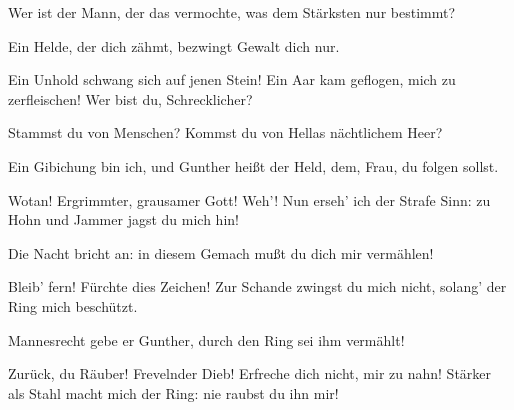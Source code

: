 \begin{drama}
\Brunnhildespeaks



Wer ist der Mann,
der das vermochte,
was dem Stärksten nur bestimmt?
 

\Siegfriedspeaks



Ein Helde, der dich zähmt,
bezwingt Gewalt dich nur.
 

\Brunnhildespeaks



Ein Unhold schwang sich auf jenen Stein!
Ein Aar kam geflogen,
mich zu zerfleischen!
Wer bist du, Schrecklicher?
 



Stammst du von Menschen?
Kommst du von Hellas nächtlichem Heer?
 

\Siegfriedspeaks



Ein Gibichung bin ich,
und Gunther heißt der Held,
dem, Frau, du folgen sollst.
 

\Brunnhildespeaks



Wotan! Ergrimmter, grausamer Gott!
Weh'! Nun erseh' ich der Strafe Sinn:
zu Hohn und Jammer jagst du mich hin!
 

\Siegfriedspeaks



Die Nacht bricht an:
in diesem Gemach
mußt du dich mir vermählen!
 

\Brunnhildespeaks



Bleib' fern! Fürchte dies Zeichen!
Zur Schande zwingst du mich nicht,
solang' der Ring mich beschützt.
 

\Siegfriedspeaks

Mannesrecht gebe er Gunther,
durch den Ring sei ihm vermählt!
 

\Brunnhildespeaks

Zurück, du Räuber!
Frevelnder Dieb!
Erfreche dich nicht, mir zu nahn!
Stärker als Stahl macht mich der Ring:
nie raubst du ihn mir!
 

\Siegfriedspeaks


\end{drama}
